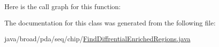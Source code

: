 Here is the call graph for this function\+:




The documentation for this class was generated from the following file\+:\begin{DoxyCompactItemize}
\item 
java/broad/pda/seq/chip/\hyperlink{_find_diffrential_enriched_regions_8java}{Find\+Diffrential\+Enriched\+Regions.\+java}\end{DoxyCompactItemize}
